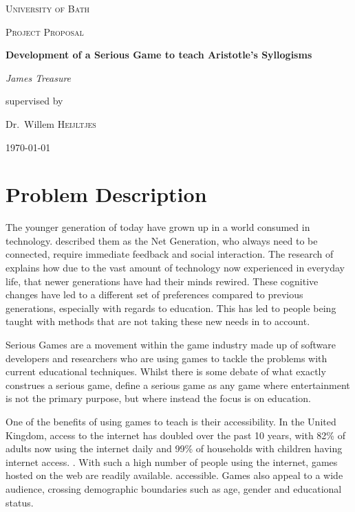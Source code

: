 \documentclass[12pt,a4paper]{report}
\begin{document}
\begin{titlepage}
	\centering
	{\scshape\LARGE University of Bath \par}
	\vspace{1cm}
	{\scshape\Large Project Proposal\par}
	\vspace{1.5cm}
	{\huge\bfseries Development of a Serious Game to teach Aristotle's Syllogisms\par}
	\vspace{2cm}
	{\Large\itshape James Treasure\par}
	\vfill
	supervised by\par
	Dr.~Willem \textsc{Heijltjes}
	\vfill
	{\large \today\par}
\end{titlepage}

\tableofcontents
\chapter{Problem Description}
The younger generation of today have grown up in a world consumed in technology. \cite{oblinger2005educating} described them as the Net Generation, who always need to be connected, require immediate feedback and social interaction. The research of \cite{prensky2001games} explains how due to the vast amount of technology now experienced in everyday life, that newer generations have had their minds rewired. These cognitive changes have led to a different set of preferences compared to previous generations, especially with regards to education. This has led to people being taught with methods that are not taking these new needs in to account.

Serious Games are a movement within the game industry made up of software developers and researchers who are using games to tackle the problems with current educational techniques. Whilst there is some debate of what exactly construes a serious game, \cite{michael2005serious} define a serious game as any game where entertainment is not the primary purpose, but where instead the focus is on education. 

One of the benefits of using games to teach is their accessibility. In the United Kingdom, access to the internet has doubled over the past 10 years, with 82\% of adults now using the internet daily and 99\% of households with children having internet access. \cite{onssurvey}. With such a high number of people using the internet, games hosted on the web are readily available. accessible. Games also appeal to a wide audience, crossing demographic boundaries such as age, gender and educational status. \cite{griffiths2002educational} 
\end{document}
